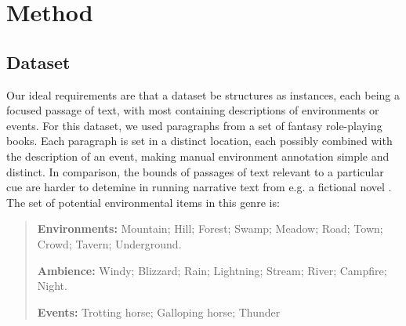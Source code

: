 \documentclass[11pt]{article}
\begin{document}
\section{Method}

\subsection{Dataset}
Our ideal requirements are that a dataset be structures as instances, each being a focused passage of text, with most containing descriptions of environments or events.
For this dataset, we used paragraphs from a set of fantasy role-playing books.%
Each paragraph is set in a distinct location, each possibly combined with the description of an event, making manual environment annotation simple and distinct.
In comparison, the bounds of passages of text relevant to a particular cue are harder to detemine in running narrative text from e.g. a fictional novel .
The set of potential environmental items in this genre is:


\begin{quote}
{\bf Environments:} Mountain; Hill; Forest; Swamp; Meadow; Road; Town; Crowd; Tavern; Underground.

{\bf Ambience:} Windy; Blizzard; Rain; Lightning; Stream; River; Campfire; Night.

{\bf Events:} Trotting horse; Galloping horse; Thunder
\end{quote}
\end{document}
